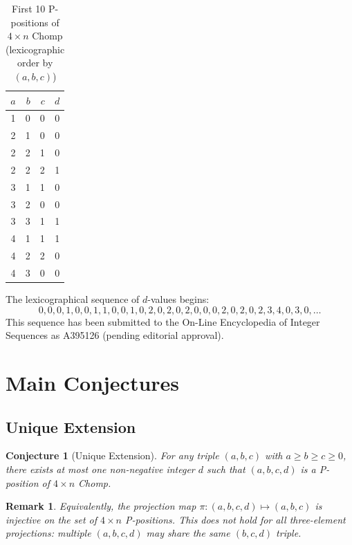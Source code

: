 \documentclass[12pt]{article}
\newtheorem{conjecture}{Conjecture}
\newtheorem{remark}{Remark}
\begin{document}
\begin{table}[h]
\centering
\caption{First 10 P-positions of $4 \times n$ Chomp
         (lexicographic order by $(a,b,c)$)}
\begin{tabular}{rrrr}
\toprule
$a$ & $b$ & $c$ & $d$ \\
\midrule
 1 & 0 & 0 & 0 \\
 2 & 1 & 0 & 0 \\
 2 & 2 & 1 & 0 \\
 2 & 2 & 2 & 1 \\
 3 & 1 & 1 & 0 \\
 3 & 2 & 0 & 0 \\
 3 & 3 & 1 & 1 \\
 4 & 1 & 1 & 1 \\
 4 & 2 & 2 & 0 \\
 4 & 3 & 0 & 0 \\
\bottomrule
\end{tabular}
\label{tab:first10}
\end{table}

The lexicographical sequence of $d$-values begins:
\[
0, 0, 0, 1, 0, 0, 1, 1, 0, 0, 1, 0, 2, 0, 2, 0, 2, 0, 0, 0,
2, 0, 2, 0, 2, 3, 4, 0, 3, 0, \ldots
\]
This sequence has been submitted to the On-Line Encyclopedia of Integer
Sequences as A395126 (pending editorial approval).

\section{Main Conjectures}

\subsection{Unique Extension}

\begin{conjecture}[Unique Extension]
\label{conj:unique}
For any triple $(a, b, c)$ with $a \geq b \geq c \geq 0$, there exists
at most one non-negative integer $d$ such that $(a, b, c, d)$ is a
P-position of $4 \times n$ Chomp.
\end{conjecture}

\begin{remark}
Equivalently, the projection map $\pi: (a,b,c,d) \mapsto (a,b,c)$
is injective on the set of $4 \times n$ P-positions. This does not
hold for all three-element projections: multiple $(a,b,c,d)$ may share
the same $(b,c,d)$ triple.
\end{remark}
\end{document}

